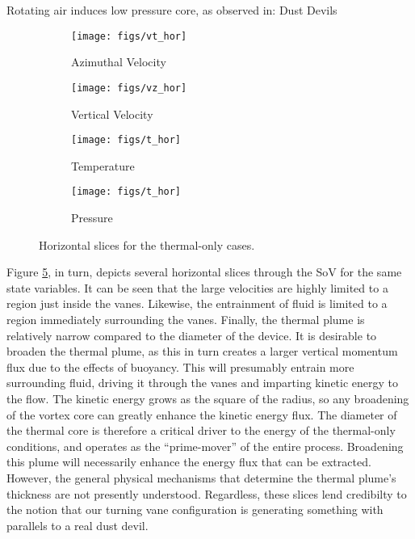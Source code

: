 Rotating air induces low pressure core, as observed in:
Dust Devils
\begin{figure}[htb]

 \begin{subfigure}{.5\textwidth}
  \centering
  \texttt{[image: figs/vt\_hor]}
  \caption{Azimuthal Velocity}
  \label{fig:vt-to}
 \end{subfigure}%
 \begin{subfigure}{.5\textwidth}
  \centering
  \texttt{[image: figs/vz\_hor]}
  \caption{Vertical Velocity}
  \label{fig:vz-to}
 \end{subfigure}%


 \begin{subfigure}{.5\textwidth}
  \centering
  \texttt{[image: figs/t\_hor]}
  \caption{Temperature}
  \label{fig:t-to}
 \end{subfigure}%
 \begin{subfigure}{.5\textwidth}
  \centering
  \texttt{[image: figs/t\_hor]}
  \caption{Pressure}
  \label{fig:p-to}
 \end{subfigure}%

 \caption{Horizontal slices for the thermal-only cases.}
 \label{fig:to-hor}
\end{figure}

Figure \ref{fig:to-hor}, in turn,  depicts several horizontal slices
through the SoV for the same state variables. It can be seen that the
large velocities are highly limited to a region just inside the
vanes. Likewise, the entrainment of fluid is limited to a region
immediately surrounding the vanes. 
%
%
Finally, the thermal plume is relatively
narrow compared to the diameter of the device. It is desirable to
broaden the thermal plume, as this in turn creates a larger vertical
momentum flux due to the effects of buoyancy. This will presumably
entrain more surrounding fluid, driving it through the vanes and
imparting kinetic energy to the flow. The kinetic energy grows as the
square of the radius, so any broadening of the vortex core can greatly
enhance the kinetic energy flux. The diameter of the thermal core is
therefore a critical driver to the energy of the thermal-only
conditions, and operates as the ``prime-mover'' of the entire
process. Broadening this plume will necessarily enhance the energy
flux that can be extracted. However, the general physical
mechanisms that determine the thermal plume's thickness are not
presently understood. 
Regardless, these slices lend credibilty to the notion that our turning
vane configuration is generating something with parallels to a real dust 
devil.   

